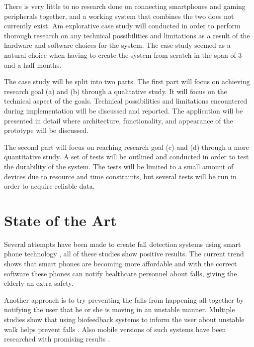 

There is very little to no research done on connecting smartphones and gaming peripherals together, and a working system that combines the two does not currently exist. Am explorative case study will conducted in order to perform thorough research on any technical possibilities and limitations as a result of the hardware and software choices for the system. The case study seemed as a natural choice when having to create the system from scratch in the span of 3 and a half months.

The case study will be split into two parts. The first part will focus on achieving research goal (a) and (b) through a qualitative study. It will focus on the technical aspect of the goals. Technical possibilities and limitations encountered during implementation will be discussed and reported. The application will be presented in detail where architecture, functionality, and appearance of the prototype will be discussed.

The second part will focus on reaching research goal (c) and (d) through a more quantitative study. A set of tests will be outlined and conducted in order to test the durability of the system. The tests will be limited to a small amount of devices due to resource and time constraints, but several tests will be run in order to acquire reliable data.

\section{State of the Art}

Several attempts have been made to create fall detection systems using smart phone technology \cite{iFall, semiSupervisedFallDetection, mobilePhoneBasedFallDetection, detectionOfFalls}, all of these studies show positive results. The current trend shows that smart phones are becoming more affordable \cite{find_some_data_here} and with the correct software these phones can notify healthcare personnel about falls, giving the elderly an extra safety.

Another approach is to try preventing the falls from happening all together by notifying the user that he or she is moving in an unstable manner. Multiple studies show that using biofeedback systems to inform the user about unstable walk helps prevent falls \cite{multiModualBiofeedback, vibrotactileBiofeedback, vibrotactileTiltFeedback}. %
Also mobile versions of such systems have been researched with promising results \cite{fallPrevention}.

